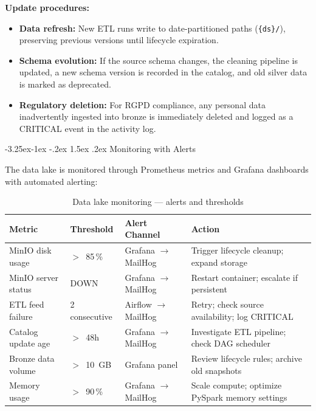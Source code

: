 \documentclass[a4paper,11pt,oneside,openany]{report}
\makeatletter
\renewcommand\subsection{\@startsection{subsection}{2}{\z@}%
  {-3.25ex\@plus -1ex \@minus -.2ex}%
  {1.5ex \@plus .2ex}%
  {\normalfont\large\bfseries\color{ntdarkgreen}}}
\newcommand{\rgpd}{RGPD}
\makeatother
\begin{document}
\textbf{Update procedures:}
\begin{itemize}[nosep]
  \item \textbf{Data refresh:} New ETL runs write to date-partitioned paths
        (\texttt{\{ds\}/}), preserving previous versions until lifecycle expiration.
  \item \textbf{Schema evolution:} If the source schema changes, the cleaning pipeline
        is updated, a new schema version is recorded in the catalog, and old silver
        data is marked as deprecated.
  \item \textbf{Regulatory deletion:} For \rgpd{} compliance, any personal data
        inadvertently ingested into bronze is immediately deleted and logged
        as a CRITICAL event in the activity log.
\end{itemize}

\subsection{Monitoring with Alerts}

The data lake is monitored through Prometheus metrics and Grafana dashboards
with automated alerting:

\begin{table}[H]
\centering
\caption{Data lake monitoring --- alerts and thresholds}
\label{tab:lake-monitoring}
\begin{tabularx}{\textwidth}{L{3.5cm} C{2cm} L{3cm} L{4cm}}
\toprule
\textbf{Metric} & \textbf{Threshold} & \textbf{Alert Channel} & \textbf{Action} \\
\midrule
MinIO disk usage & $>$~85\,\% & Grafana $\to$ MailHog & Trigger lifecycle cleanup; expand storage \\
MinIO server status & DOWN & Grafana $\to$ MailHog & Restart container; escalate if persistent \\
ETL feed failure & 2 consecutive & Airflow $\to$ MailHog & Retry; check source availability; log CRITICAL \\
Catalog update age & $>$~48h & Grafana $\to$ MailHog & Investigate ETL pipeline; check DAG scheduler \\
Bronze data volume & $>$~10~GB & Grafana panel & Review lifecycle rules; archive old snapshots \\
Memory usage & $>$~90\,\% & Grafana $\to$ MailHog & Scale compute; optimize PySpark memory settings \\
\bottomrule
\end{tabularx}
\end{table}
\end{document}
